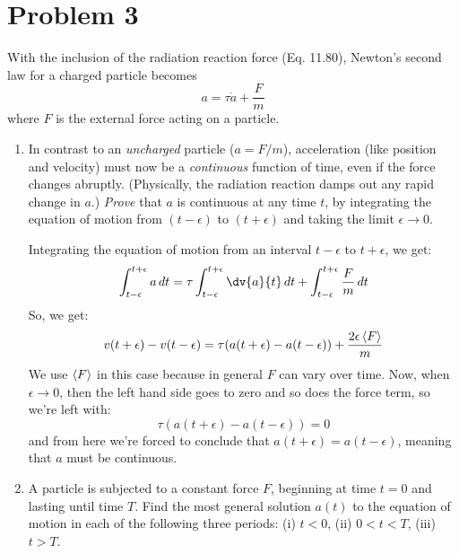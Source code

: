 \documentclass[10pt]{article}
\begin{document}
	\pagebreak
	\section*{Problem 3}
	With the inclusion of the radiation reaction force (Eq. 11.80), Newton's second law for a charged particle
	becomes 
	\[
		a = \tau \dot a + \frac{F}{m}
	\]
	where \( F \) is the external force acting on a particle. 
	\begin{enumerate}[label=(\alph*)]
		\item In contrast to an \textit{uncharged} particle (\( a = F / m \)), acceleration (like position
			and velocity) must now be a \textit{continuous} function of time, even if the force changes
			abruptly. (Physically, the radiation reaction damps out any rapid change in \( a \).)
			\textit{Prove} that \( a \) is continuous at any time \( t \), by integrating the equation of
			motion from \( (t - \epsilon) \) to \( (t + \epsilon) \) and taking the limit \( \epsilon \to 0 \). 

			\begin{solution}
				Integrating the equation of motion from an interval \( t - \epsilon \) to \( t + \epsilon \),
				we get:
				\[
					\int_{t - \epsilon}^{t + \epsilon} a \diff t = \tau \int_{t - \epsilon}^{t + \epsilon}
					\dv{a}{t} \diff t + \int_{t - \epsilon}^{t + \epsilon} \frac{F}{m} \diff t
				\]
				So, we get:
				\[
					v(t + \epsilon) - v(t - \epsilon) = \tau (a(t + \epsilon) - a(t - \epsilon)) + \frac{2
					\epsilon \left\langle F \right\rangle}{m}
				\]
				We use \( \left\langle F \right\rangle \) in this case because in general \( F \) can vary over time. Now, when
				\( \epsilon \to 0 \), then the left hand side goes to zero and so does the force term, so
				we're left with:
				\[
					\tau (a(t + \epsilon) - a(t - \epsilon)) = 0 
				\]
				and from here we're forced to conclude that \( a(t + \epsilon) = a(t - \epsilon) \), meaning
				that \( a \) must be continuous. 
			\end{solution}
		\item A particle is subjected to a constant force \( F \), beginning at time \( t = 0 \) and lasting
			until time \( T \). Find the most general solution \( a(t) \) to the equation of motion in each
			of the following three periods: (i) \( t < 0 \), (ii) \( 0 < t < T \), (iii) \( t > T \). 


\end{enumerate}
\end{document}
